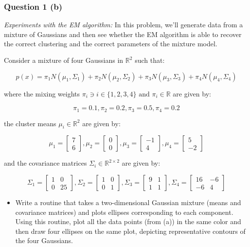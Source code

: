 \documentclass{article}
\begin{document}
\subsubsection*{Question 1 (b)}
\begin{flushleft}
\textit{Experiments with the EM algorithm:} In this problem, we'll generate data from a mixture of Gaussians and then see whether the EM algorithm is able to recover the correct clustering and the correct parameters of the mixture model.
\end{flushleft}
\begin{flushleft}
    Consider a mixture of four Gaussians in $\mathbb{R}^2$ such that:
\end{flushleft}
$$p(x) = \pi_1 N(\mu_1, \Sigma_1) + \pi_2 N(\mu_2, \Sigma_2) + \pi_3 N(\mu_3, \Sigma_3) + \pi_4 N(\mu_4, \Sigma_4)$$
\begin{flushleft}
    where the mixing weights $\pi_i \ni i \in \{1,2,3,4\} \text{ and } \pi_i \in \mathbb{R}$ are given by:
\end{flushleft}
$$\pi_1 = 0.1, \pi_2 = 0.2, \pi_3 = 0.5, \pi_4 = 0.2$$
\begin{flushleft}
    the cluster means $\mu_i \in \mathbb{R}^2$ are given by:
\end{flushleft}
$$\mu_1 = \begin{bmatrix}7 \\ 6\end{bmatrix}, \mu_2 = \begin{bmatrix}0 \\ 0\end{bmatrix}, \mu_3 = \begin{bmatrix}-1 \\ 4\end{bmatrix}, \mu_4 = \begin{bmatrix}5 \\ -2\end{bmatrix}$$
\begin{flushleft}
    and the covariance matrices $\Sigma_i \in \mathbb{R}^{2 \times 2}$ are given by:
\end{flushleft}
$$\Sigma_1 = \begin{bmatrix}1 & 0 \\ 0 & 25\end{bmatrix}, \Sigma_2 = \begin{bmatrix}1 & 0 \\ 0 & 1\end{bmatrix}, \Sigma_3 = \begin{bmatrix}9 & 1 \\ 1 & 1\end{bmatrix}, \Sigma_4 = \begin{bmatrix}16 & -6 \\ -6 & 4\end{bmatrix}$$
\begin{itemize}
    \item Write a routine that takes a two-dimensional Gaussian mixture (means and covariance matrices) and plots ellipses corresponding to each component. Using this routine, plot all the data points (from (a)) in the same color and then draw four ellipses on the same plot, depicting representative contours of the four Gaussians.
\end{itemize}
\end{document}
